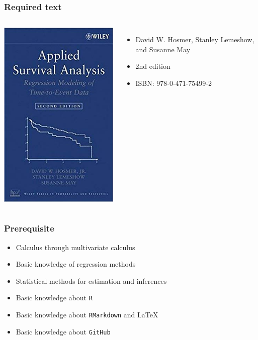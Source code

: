 \documentclass{beamer}
\begin{document}
\begin{frame}
\frametitle{Required text}
\begin{columns}
\begin{center}
\includegraphics[scale = .4]{coursebook}
\end{center}
\begin{itemize}
\item David W. Hosmer, Stanley Lemeshow, and Susanne May
\item 2nd edition
\item ISBN: 978-0-471-75499-2
\end{itemize}
\end{columns}
\end{frame}

\begin{frame}
\frametitle{Prerequisite}
\begin{itemize}
\item Calculus through multivariate calculus 
\item Basic knowledge of regression methods
\item Statistical methods for estimation and inferences
\item Basic knowledge about \texttt{R} 
\item Basic knowledge about \texttt{RMarkdown} and \LaTeX
\item Basic knowledge about \texttt{GitHub} 
\end{itemize}
\end{frame}
\end{document}
